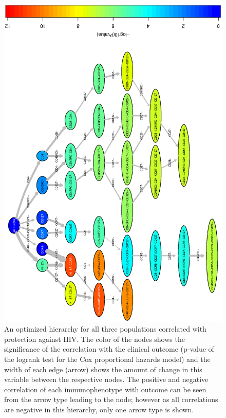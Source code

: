 \begin{landscape}
  \begin{figure}[!hp]
    \begin{center}
      \includegraphics[width=\textwidth,angle=270]{figs/rchy/merged}
    \end{center}
    \caption{An optimized hierarchy for all three populations correlated with protection against HIV.
      The color of the nodes shows the significance of the correlation with the clinical outcome (p-value of the logrank test for the Cox proportional hazards model) and the width of each edge (arrow) shows the amount of change in this variable between the respective nodes.
      The positive and negative correlation of each immunophenotype with outcome can be seen from the arrow type leading to the node; however as all correlations are negative in this hierarchy, only one arrow type is shown. 
   }
    \label{r1:merged}
  \end{figure}
\end{landscape}


